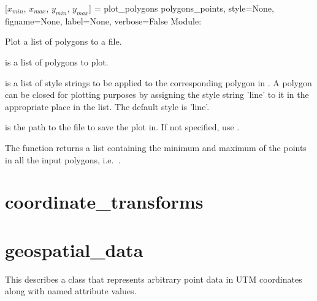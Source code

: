 \documentclass{manual}
\begin{document}
\begin{funcdesc}{[$x_{min}$, $x_{max}$, $y_{min}$, $y_{max}$] = plot_polygons}
                               {polygons_points, style=None,
                                figname=None, label=None, verbose=False}
Module: 

Plot a list of polygons to a file.

 is a list of polygons to plot.

 is a list of style strings to be applied to the corresponding polygon
in . A polygon can be closed for plotting purposes by assigning
the style string 'line' to it in the appropriate place in the  list.
The default style is 'line'.

 is the path to the file to save the plot in.  If not specified, use
.

The function returns a list containing the minimum and maximum of the points in all the
input polygons, i.e.\ .
\end{funcdesc}


\pagebreak
\section{coordinate_transforms}


\pagebreak
\section{geospatial_data}
\label{sec:geospatial}

This describes a class that represents arbitrary point data in UTM
coordinates along with named attribute values.

\end{document}
